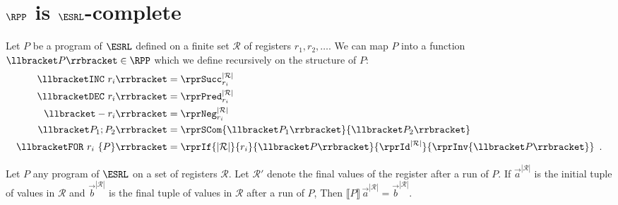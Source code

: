 \section{$ \RPP $ is $ \ESRL $-complete}
\label{section:RPP is ESRL-complete}


Let $ P $ be a program of $ \ESRL $ \cite{matos03tcs} defined on a finite set $ \mathcal{R} $ of registers $ r_1, r_2, \dots $.
We can map $ P $ into a function $ \llbracket  P \rrbracket \in\RPP$ which we define recursively on the structure of $ P $:
\begin{align*}
\llbracket \mathtt{INC}\ r_i\rrbracket & = \rprSucc^{|\mathcal{R}|}_{r_i}
\\
\llbracket \mathtt{DEC}\ r_i\rrbracket & = \rprPred^{|\mathcal{R}|}_{r_i}
\\
\llbracket -r_i\rrbracket & = \rprNeg^{|\mathcal{R}|}_{r_i}
\\
\llbracket P_1; P_2\rrbracket & = \rprSCom{\llbracket P_1\rrbracket}
                                          {\llbracket P_2\rrbracket}
\\
\llbracket \mathtt{FOR}\ r_i\ \mathtt{\{} P \mathtt{ \} }\rrbracket & = 
\rprIf{|\mathcal{R}|}
      {r_i}
      {\llbracket  P \rrbracket}
      {\rprId^{|\mathcal{R}|}}
      {\rprInv{\llbracket  P \rrbracket}}
\enspace .
\end{align*}

\begin{lemma}
\label{lemma:RPP is ESRL-complete}
Let $ P $ any program of $ \ESRL $ on a set of registers $ \mathcal{R} $. 
Let $\mathcal{R}' $ denote the final values of the register after a run of $ P $.
If $ \vec{a}^{|\mathcal{R}|} $ is the initial tuple of values in $ \mathcal{R} $ and
$ \vec{b}^{|\mathcal{R}|} $ is the final tuple of values in $ \mathcal{R} $ after a run of $ P $,
Then $ \llbracket  P \rrbracket\, \vec{a}^{|\mathcal{R}|} = \vec{b}^{|\mathcal{R}|}$.
\end{lemma}



 

